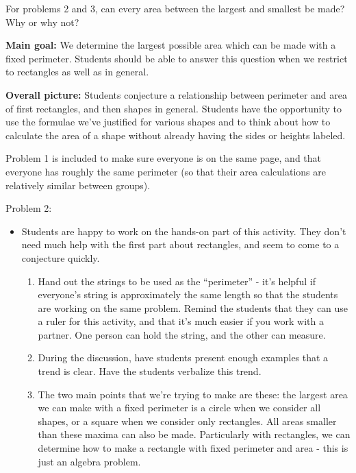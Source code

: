 \documentclass[noauthor,nooutcomes]{ximera}
\begin{document}
\begin{problem} For problems 2 and 3, can every area between the largest and smallest be made?  Why or why not?






\end{problem}


\newpage

\begin{instructorNotes}
{\bf Main goal:} We determine the largest possible area which can be made with a fixed perimeter. Students should be able to answer this question when we restrict to rectangles as well as in general.


{\bf Overall picture:}  Students conjecture a relationship between perimeter and area of first rectangles, and then shapes in general.  Students have the opportunity to use the formulae we've justified for various shapes and to think about how to calculate the area of a shape without already having the sides or heights labeled.

Problem 1 is included to make sure everyone is on the same page, and that everyone has roughly the same perimeter (so that their area calculations are relatively similar between groups). 

Problem 2: 
\begin{itemize}
\item Students are happy to work on the hands-on part of this activity.  They don't need much help with the first part about rectangles, and seem to come to a conjecture quickly.
\begin{enumerate}
\item Hand out the strings to be used as the ``perimeter'' - it's helpful if everyone's string is approximately the same length so that the students are working on the same problem.  Remind the students that they can use a ruler for this activity, and that it's much easier if you work with a partner.  One person can hold the string, and the other can measure.
	\item During the discussion, have students present enough examples that a trend is clear.  Have the students verbalize this trend.
	\item The two main points that we're trying to make are these: the largest area we can make with a fixed perimeter is a circle when we consider all shapes, or a square when we consider only rectangles.  All areas smaller than these maxima can also be made.  Particularly with rectangles, we can determine how to make a rectangle with fixed perimeter and area - this is just an algebra problem.


\end{enumerate}
\end{itemize}
\end{instructorNotes}
\end{document}
